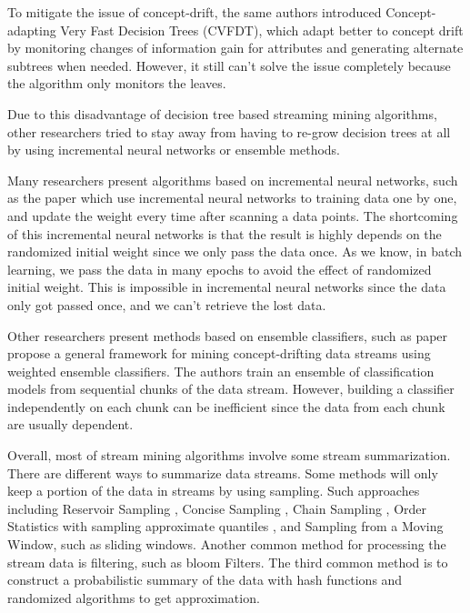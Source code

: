 \documentclass[conference]{IEEEtran}
\begin{document}
To mitigate the issue of concept-drift, the same authors introduced Concept-adapting Very Fast Decision Trees (CVFDT), which adapt better to concept drift by monitoring changes of information gain for attributes and generating alternate subtrees when needed. However, it still can't solve the issue completely because the algorithm only monitors the leaves.


Due to this disadvantage of decision tree based streaming mining algorithms, other researchers tried to stay away from having to re-grow decision trees at all by using incremental neural networks or ensemble methods.

Many researchers present algorithms based on incremental neural networks, such as the paper \cite{NN1,NN2,NN3,NN4} which use incremental neural networks to training data one by one, and update the weight every time after scanning a data points. The shortcoming of this incremental neural networks is that the result is highly depends on the randomized initial weight since we only pass the data once. As we know, in batch learning, we pass the data in many epochs to avoid the effect of randomized initial weight. This is impossible in incremental neural networks since the data only got passed once, and we can't retrieve the lost data.

Other researchers present methods based on ensemble classifiers, such as paper \cite{ensemble1} propose a general framework for mining concept-drifting data streams using weighted ensemble classifiers. The authors train an ensemble of classification models from sequential chunks of the data stream. However, building a classifier independently on each chunk can be inefficient since the data from each chunk are usually dependent. 

Overall, most of stream mining algorithms involve some stream summarization. There are different ways to summarize data streams. Some methods will only keep a portion of the data in streams by using sampling. Such approaches including Reservoir Sampling \cite{vitter}, Concise Sampling \cite{Gibbons}, Chain Sampling \cite{Babcock}, Order Statistics with sampling approximate quantiles \cite{Manku}, and Sampling from a Moving Window, such as sliding windows. Another common method for processing the stream data is filtering, such as bloom Filters. The third common method is to construct a probabilistic summary of the data with hash functions and randomized algorithms to get approximation. 
\end{document}
